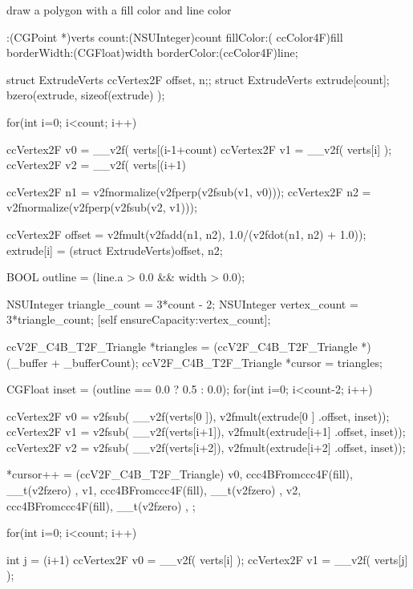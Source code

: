 draw a polygon with a fill color and line color 
\begin{DoxyCode}
                        :(CGPoint *)verts count:(NSUInteger)count fillColor:(
      ccColor4F)fill  borderWidth:(CGFloat)width borderColor:(ccColor4F)line;
{
        struct ExtrudeVerts {ccVertex2F offset, n;};
        struct ExtrudeVerts extrude[count];
        bzero(extrude, sizeof(extrude) );
        
        for(int i=0; i<count; i++){
                ccVertex2F v0 = __v2f( verts[(i-1+count)%
                ccVertex2F v1 = __v2f( verts[i] );
                ccVertex2F v2 = __v2f( verts[(i+1)%
        
                ccVertex2F n1 = v2fnormalize(v2fperp(v2fsub(v1, v0)));
                ccVertex2F n2 = v2fnormalize(v2fperp(v2fsub(v2, v1)));
                
                ccVertex2F offset = v2fmult(v2fadd(n1, n2), 1.0/(v2fdot(n1, n2)
       + 1.0));
                extrude[i] = (struct ExtrudeVerts){offset, n2};
        }
        
        BOOL outline = (line.a > 0.0 && width > 0.0);
        
        NSUInteger triangle_count = 3*count - 2;
        NSUInteger vertex_count = 3*triangle_count;
        [self ensureCapacity:vertex_count];
        
        ccV2F_C4B_T2F_Triangle *triangles = (ccV2F_C4B_T2F_Triangle *)(_buffer 
      + _bufferCount);
        ccV2F_C4B_T2F_Triangle *cursor = triangles;
        
        CGFloat inset = (outline == 0.0 ? 0.5 : 0.0);
        for(int i=0; i<count-2; i++){
                ccVertex2F v0 = v2fsub( __v2f(verts[0  ]), v2fmult(extrude[0  ]
      .offset, inset));
                ccVertex2F v1 = v2fsub( __v2f(verts[i+1]), v2fmult(extrude[i+1]
      .offset, inset));
                ccVertex2F v2 = v2fsub( __v2f(verts[i+2]), v2fmult(extrude[i+2]
      .offset, inset));
                
                *cursor++ = (ccV2F_C4B_T2F_Triangle){
                        {v0, ccc4BFromccc4F(fill), __t(v2fzero) },
                        {v1, ccc4BFromccc4F(fill), __t(v2fzero) },
                        {v2, ccc4BFromccc4F(fill), __t(v2fzero) },
                };
        }
        
        for(int i=0; i<count; i++){
                int j = (i+1)%
                ccVertex2F v0 = __v2f( verts[i] );
                ccVertex2F v1 = __v2f( verts[j] );
                
}}
\end{DoxyCode}
